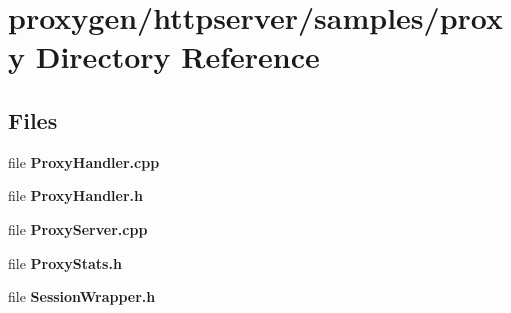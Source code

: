 \section{proxygen/httpserver/samples/proxy Directory Reference}
\label{dir_aa21261dc3485917f7094fd230a75408}
\subsection*{Files}
\begin{DoxyCompactItemize}
\item 
file {\bf Proxy\+Handler.\+cpp}
\item 
file {\bf Proxy\+Handler.\+h}
\item 
file {\bf Proxy\+Server.\+cpp}
\item 
file {\bf Proxy\+Stats.\+h}
\item 
file {\bf Session\+Wrapper.\+h}
\end{DoxyCompactItemize}
